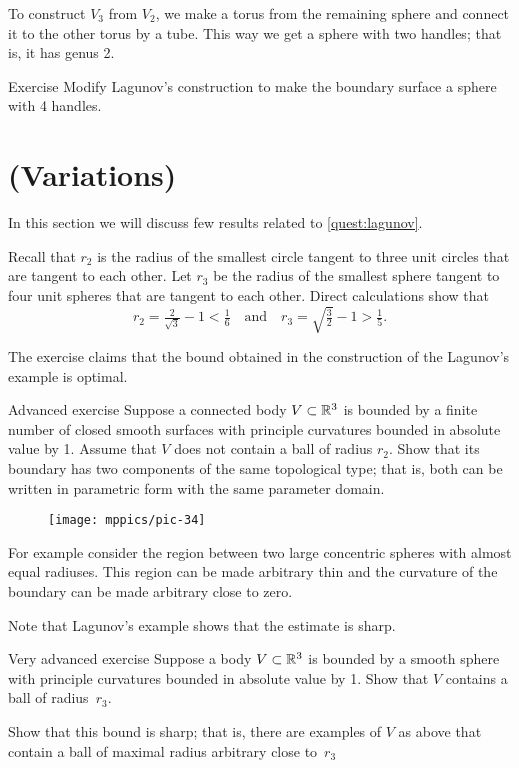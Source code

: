 To construct $V_3$ from $V_2$, we make a torus from the remaining sphere and connect it to the other torus by a tube.
This way we get a sphere with two handles; that is, it has genus 2.

\begin{thm}{Exercise}\label{ex:lagunov-genus4}
Modify Lagunov's construction to make the boundary surface a sphere with 4 handles.
\end{thm}

\section{(Variations)}

In this section we will discuss few results related to \ref{quest:lagunov}.

Recall that $r_2$ is the radius of the smallest circle tangent to three unit circles that are tangent to each other.
Let $r_3$
be the radius of the smallest sphere tangent to four unit spheres that are tangent to each other.
Direct calculations show that 
\[r_2=\tfrac2{\sqrt{3}}-1< \tfrac16\quad\text{and}\quad r_3=\sqrt{\tfrac32}-1>\tfrac15.\]

The exercise claims that the bound obtained in the construction of the Lagunov's example is optimal.


\begin{thm}{Advanced exercise}\label{ex:thin}
Suppose a connected body $V\subset \mathbb{R}^3$ is bounded by a finite number of closed smooth surfaces with principle curvatures bounded in absolute value by 1.
Assume that $V$ does not contain a ball of radius $r_2$.
Show that its boundary has two components of the same topological type; 
that is, both can be written in parametric form with the same parameter domain. 
\end{thm}

\begin{wrapfigure}{o}{33 mm}
\vskip-4mm
\centering
\texttt{[image: mppics/pic-34]}
\vskip0mm
\end{wrapfigure}

For example consider the region between two large concentric spheres with almost equal radiuses. 
This region can be made arbitrary thin and the curvature of the boundary can be made arbitrary close to zero.

Note that Lagunov's example shows that the estimate is sharp.


\begin{thm}{Very advanced exercise}\label{ex:PI-sphere}
Suppose a body $V\subset \mathbb{R}^3$ is bounded by a smooth sphere with principle curvatures bounded in absolute value by 1.
Show that $V$ contains a ball of radius~$r_3$.

Show that this bound is sharp; that is, there are examples of $V$ as above that contain a ball of maximal radius arbitrary close to~$r_3$
\end{thm}




